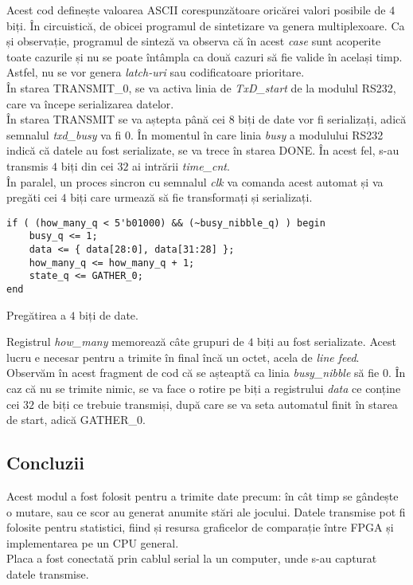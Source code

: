 \documentclass[12pt,twoside,a4paper,fleqn]{book}
\theoremstyle{definition}
\begin{document}
Acest cod definește valoarea ASCII corespunzătoare oricărei valori posibile de $4$ biți. În circuistică, de obicei programul de sintetizare va genera multiplexoare. Ca și observație, programul de sinteză va observa că în acest \emph{case} sunt acoperite toate cazurile și nu se poate întâmpla ca două cazuri să fie valide în același timp. Astfel, nu se vor genera \emph{latch-uri} sau codificatoare prioritare.\\
În starea TRANSMIT\_0, se va activa linia de \emph{TxD\_start} de la modulul RS232, care va începe serializarea datelor.\\
În starea TRANSMIT se va aștepta până cei $8$ biți de date vor fi serializați, adică semnalul \emph{txd\_busy} va fi $0$. În momentul în care linia \emph{busy} a modulului RS232 indică că datele au fost serializate, se va trece în starea DONE. În acest fel, s-au transmis $4$ biți din cei $32$ ai intrării \emph{time\_cnt}.\\
În paralel, un proces sincron cu semnalul \emph{clk} va comanda acest automat și va pregăti cei $4$ biți care urmează să fie transformați și serializați. 
\begin{fragmentsursa}
\begin{scriptsize}
\begin{verbatim}
if ( (how_many_q < 5'b01000) && (~busy_nibble_q) ) begin
    busy_q <= 1;
    data <= { data[28:0], data[31:28] };
    how_many_q <= how_many_q + 1;
    state_q <= GATHER_0;
end	
\end{verbatim}
\end{scriptsize}
\caption{Pregătirea a $4$ biți de date.}
\label{ta_frag2}
\end{fragmentsursa}
Registrul \emph{how\_many} memorează câte grupuri de $4$ biți au fost serializate. Acest lucru e necesar pentru a trimite în final încă un octet, acela de \emph{line feed}. Observăm în acest fragment de cod că se așteaptă ca linia \emph{busy\_nibble} să fie $0$. În caz că nu se trimite nimic, se va face o rotire pe biți a registrului \emph{data} ce conține cei $32$ de biți ce trebuie transmiși, după care se va seta automatul finit în starea de start, adică GATHER\_0.
\subsection{Concluzii}
Acest modul a fost folosit pentru a trimite date precum: în cât timp se gândește o mutare, sau ce scor au generat anumite stări ale jocului. Datele transmise pot fi folosite pentru statistici, fiind și resursa graficelor de comparație între FPGA și implementarea pe un CPU general.\\
Placa a fost conectată prin cablul serial la un computer, unde s-au capturat datele transmise.
\end{document}
